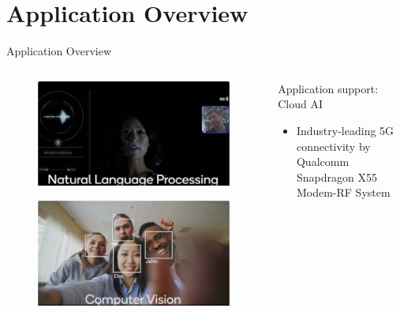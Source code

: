 \documentclass[12pt]{beamer}
\begin{document}
\section{Application Overview}
\begin{frame}{Application Overview}
    \begin{columns}
        \begin{column}{0.5\linewidth}
            \begin{figure}[H]
                \centering
                \includegraphics[width=1\columnwidth]{4.png}
            \end{figure}
            \begin{figure}[H]
                \centering
                \includegraphics[width=1\columnwidth]{5.png}
            \end{figure}
        \end{column}
        \begin{column}{0.5\linewidth}
            Application support: Cloud AI
            \begin{itemize}
                \scriptsize
                \item Industry-leading 5G connectivity by Qualcomm Snapdragon X55 Modem-RF System

\end{itemize}
\end{column}
\end{columns}
\end{frame}
\end{document}
